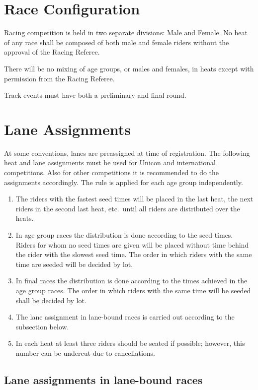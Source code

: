 \section{Race Configuration}

Racing competition is held in two separate divisions: Male and Female.
No heat of any race shall be composed of both male and female riders without the approval of the Racing Referee.

There will be no mixing of age groups, or males and females, in heats except with permission from the Racing Referee.

Track events must have both a preliminary and final round.

\section{Lane Assignments}

At some conventions, lanes are preassigned at time of registration.
The following heat and lane assignments must be used for Unicon and international competitions.
Also for other competitions it is recommended to do the assignments accordingly.
The rule is applied for each age group independently.
\begin{enumerate}
\item The riders with the fastest seed times will be placed in the last heat, the next riders in the second last heat, etc.\ until all riders are distributed over the heats.
\item In age group races the distribution is done according to the seed times.
Riders for whom no seed times are given will be placed without time behind the rider with the slowest seed time.
The order in which riders with the same time are seeded will be decided by lot.
\item In final races the distribution is done according to the times achieved in the age group races.
The order in which riders with the same time will be seeded shall be decided by lot.
\item The lane assignment in lane-bound races is carried out according to the subsection below.
\item In each heat at least three riders should be seated if possible; however, this number can be undercut due to cancellations.
\end{enumerate}

\subsection{Lane assignments in lane-bound races}

